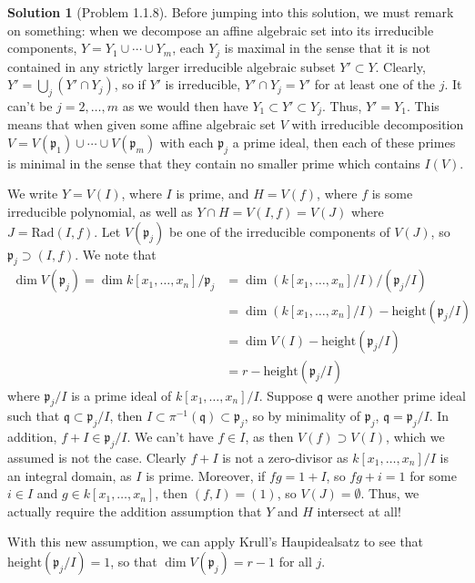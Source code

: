 \documentclass[aps,pra,showpacs,notitlepage,onecolumn,superscriptaddress,nofootinbib]{revtex4-1}
\theoremstyle{definition}
\newtheorem{solution}{Solution}[section]
\begin{document}
\begin{solution}[Problem 1.1.8]
  Before jumping into this solution, we must remark on something: when we decompose an affine algebraic set into its irreducible components, $Y = Y_1 \cup \cdots \cup Y_m$, each $Y_j$ is maximal
  in the sense that it is not contained in any strictly larger irreducible algebraic subset $Y' \subset Y$. Clearly, $Y' = \bigcup_{j} (Y' \cap Y_j)$, so if $Y'$ is irreducible, $Y' \cap Y_j = Y'$ for at least
  one of the $j$. It can't be $j = 2, \dots, m$ as we would then have $Y_1 \subset Y' \subset Y_j$. Thus, $Y' = Y_1$.
  This means that when given some affine algebraic set $V$ with irreducible decomposition $V = V(\mathfrak{p}_1) \cup \cdots \cup V(\mathfrak{p}_m)$ with each $\mathfrak{p}_j$ a prime ideal, then each of
  these primes is minimal in the sense that they contain no smaller prime which contains $I(V)$.

  We write $Y = V(I)$, where $I$ is prime, and $H = V(f)$, where $f$ is some irreducible polynomial, as well as $Y \cap H = V(I, f) = V(J)$ where $J = \text{Rad}(I, f)$.
  Let $V(\mathfrak{p}_j)$ be one of the irreducible components of $V(J)$, so $\mathfrak{p}_j \supset (I, f)$. We note that
  \begin{align}
    \dim V(\mathfrak{p}_j) = \dim k[x_1, \dots, x_n]/\mathfrak{p}_j &= \dim (k[x_1, \dots, x_n]/I)/(\mathfrak{p}_j/I)
    \\ &= \dim(k[x_1, \dots, x_n]/I) - \text{height}(\mathfrak{p}_j/I)
    \\ &= \dim V(I) - \text{height}(\mathfrak{p}_j/I)
    \\ &= r - \text{height}(\mathfrak{p}_j/I)
    \end{align}
  where $\mathfrak{p}_j/I$ is a prime ideal of $k[x_1, \dots, x_n]/I$. Suppose $\mathfrak{q}$ were another prime ideal such that $\mathfrak{q} \subset \mathfrak{p}_j/I$, then $I \subset \pi^{-1}(\mathfrak{q}) \subset \mathfrak{p}_j$,
  so by minimality of $\mathfrak{p}_j$, $\mathfrak{q} = \mathfrak{p}_j/I$. In addition, $f + I \in \mathfrak{p}_j/I$. We can't have $f \in I$, as then $V(f) \supset V(I)$,
  which we assumed is not the case. Clearly $f + I$ is not a zero-divisor as $k[x_1, \dots, x_n]/I$ is an integral domain, as $I$ is prime. Moreover, if $fg = 1 + I$, so $fg + i = 1$ for some $i \in I$ and $g \in k[x_1, \dots, x_n]$,
  then $(f, I) = (1)$, so $V(J) = \emptyset$. Thus, we actually require the addition assumption that $Y$ and $H$ intersect at all!

  With this new assumption, we can apply Krull's Haupidealsatz to see that $\text{height}(\mathfrak{p}_j/I) = 1$, so that $\dim V(\mathfrak{p}_j) = r - 1$ for all $j$.
  \end{solution}
\end{document}
